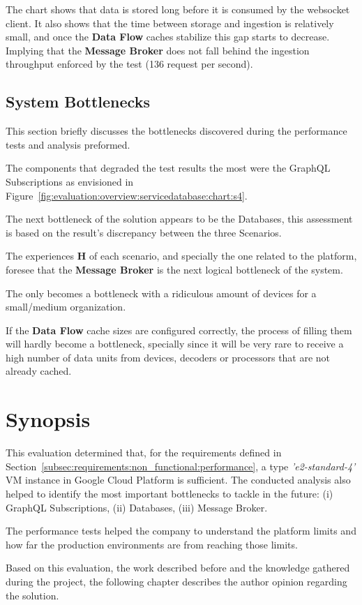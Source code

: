The chart shows that data is stored long before it is consumed by the websocket client. It also shows that the time between storage and ingestion is relatively small, and once the \textbf{Data Flow} caches stabilize this gap starts to decrease. Implying that the \textbf{Message Broker} does not fall behind the ingestion throughput enforced by the test (136 request per second).

\subsection{System Bottlenecks}
\label{sec:evaluation:overview:bottlenecks}

This section briefly discusses the bottlenecks discovered during the performance tests and analysis preformed.

The components that degraded the test results the most were the GraphQL Subscriptions as envisioned in Figure~\ref{fig:evaluation:overview:servicedatabase:chart:s4}.

The next bottleneck of the solution appears to be the  Databases, this assessment is based on the result's discrepancy between the three Scenarios.

The experiences \textbf{H} of each scenario, and specially the one related to the platform, foresee that the \textbf{Message Broker} is the next logical bottleneck of the system.

The  only becomes a bottleneck with a ridiculous amount of devices for a small/medium organization.

If the \textbf{Data Flow} cache sizes are configured correctly, the process of filling them will hardly become a bottleneck, specially since it will be very rare to receive a high number of data units from devices, decoders or processors that are not already cached.

\section{Synopsis}
\label{sec:evaluation:synopsis}

This evaluation determined that, for the requirements defined in Section~\ref{subsec:requirements:non_functional:performance}, a type \textit{'e2-standard-4'} \gls{VM} instance in Google Cloud Platform is sufficient. The conducted analysis also helped to identify the most important bottlenecks to tackle in the future: (i) GraphQL Subscriptions, (ii)  Databases, (iii) Message Broker.

The performance tests helped the company to understand the platform limits and how far the production environments are from reaching those limits.

Based on this evaluation, the work described before and the knowledge gathered during the project, the following chapter describes the author opinion regarding the solution.
